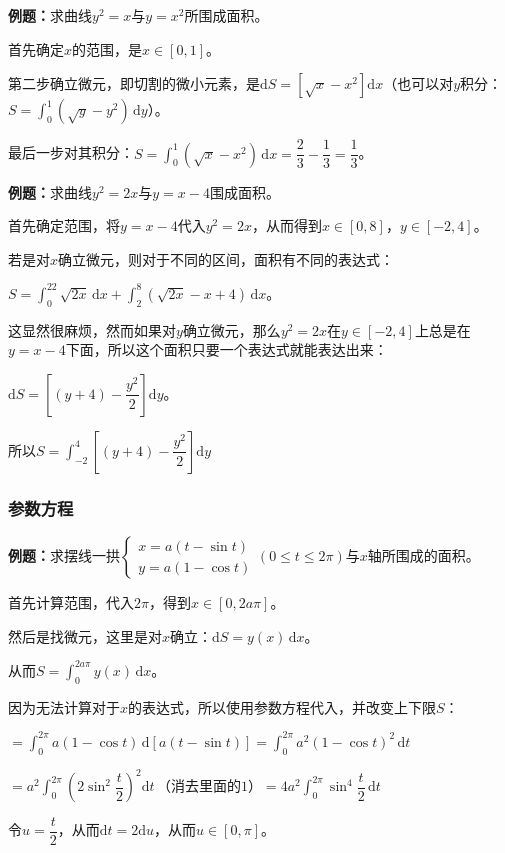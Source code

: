\documentclass[UTF8, 12pt]{ctexart}
\begin{document}
\textbf{例题：}求曲线$y^2=x$与$y=x^2$所围成面积。

首先确定$x$的范围，是$x\in[0,1]$。

第二步确立微元，即切割的微小元素，是$\textrm{d}S=[\sqrt{x}-x^2]\textrm{d}x$（也可以对$y$积分：$S=\int_0^1(\sqrt{y}-y^2)\,\textrm{d}y$）。

最后一步对其积分：$S=\int_0^1(\sqrt{x}-x^2)\,\textrm{d}x=\dfrac{2}{3}-\dfrac{1}{3}=\dfrac{1}{3}$。

\textbf{例题：}求曲线$y^2=2x$与$y=x-4$围成面积。

首先确定范围，将$y=x-4$代入$y^2=2x$，从而得到$x\in[0,8]$，$y\in[-2,4]$。

若是对$x$确立微元，则对于不同的区间，面积有不同的表达式：

$S=\int_0^22\sqrt{2x}\,\textrm{d}x+\int_2^8(\sqrt{2x}-x+4)\,\textrm{d}x$。

这显然很麻烦，然而如果对$y$确立微元，那么$y^2=2x$在$y\in[-2,4]$上总是在$y=x-4$下面，所以这个面积只要一个表达式就能表达出来：

$\textrm{d}S=\left[(y+4)-\dfrac{y^2}{2}\right]\textrm{d}y$。

所以$S=\displaystyle{\int_{-2}^4\left[(y+4)-\dfrac{y^2}{2}\right]\textrm{d}y}$

\subsubsection{参数方程}

\textbf{例题：}求摆线一拱$\left\{\begin{array}{l}
    x=a(t-\sin t) \\
    y=a(1-\cos t)
\end{array}
\right.$$(0\leqslant t\leqslant 2\pi)$与$x$轴所围成的面积。\medskip

首先计算范围，代入$2\pi$，得到$x\in[0,2a\pi]$。

然后是找微元，这里是对$x$确立：$\textrm{d}S=y(x)\,\textrm{d}x$。

从而$S=\int_0^{2a\pi}y(x)\,\textrm{d}x$。

因为无法计算对于$x$的表达式，所以使用参数方程代入，并改变上下限$S$：

$=\int_0^{2\pi}a(1-\cos t)\,\textrm{d}[a(t-\sin t)]=\int_0^{2\pi}a^2(1-\cos t)^2\,\textrm{d}t$

$=a^2\displaystyle{\int_0^{2\pi}\left(2\sin^2\dfrac{t}{2}\right)^2\textrm{d}t}\,\text{（消去里面的1）}=4a^2\displaystyle{\int_0^{2\pi}\sin^4\dfrac{t}{2}\,\textrm{d}t}$

令$u=\dfrac{t}{2}$，从而$\textrm{d}t=2\textrm{d}u$，从而$u\in[0,\pi]$。
\end{document}
